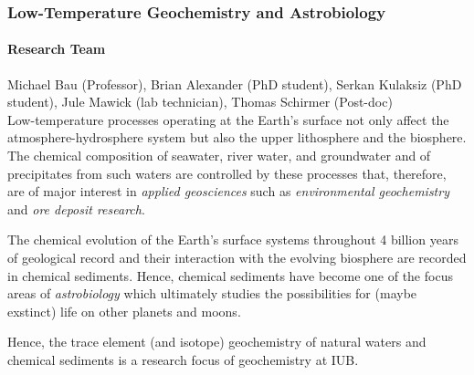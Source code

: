 \subsubsection{Low-Temperature Geochemistry and Astrobiology}

\paragraph{Research Team}
Michael Bau (Professor), Brian Alexander (PhD student), Serkan
Kulaksiz (PhD student), Jule Mawick (lab technician), Thomas
Schirmer
(Post-doc) \\


Low-temperature processes operating at the Earth's surface not only
affect the atmosphere-hydrosphere system but also the upper
lithosphere and the biosphere. The chemical composition of seawater,
river water, and groundwater and of precipitates from such waters are
controlled by these processes that, therefore, are of major interest
in \textit{applied geosciences} such as \textit{environmental
geochemistry} and \textit{ore deposit research}.

The chemical evolution of the Earth's surface systems
throughout 4 billion years of geological record and their interaction
with the evolving biosphere are recorded in chemical sediments. Hence,
chemical sediments have become one of the focus areas of
\textit{astrobiology} which ultimately studies the possibilities for
(maybe exstinct) life on other planets and moons.

Hence, the trace element (and isotope) geochemistry of natural
waters and chemical sediments is a research focus of geochemistry at
IUB.

